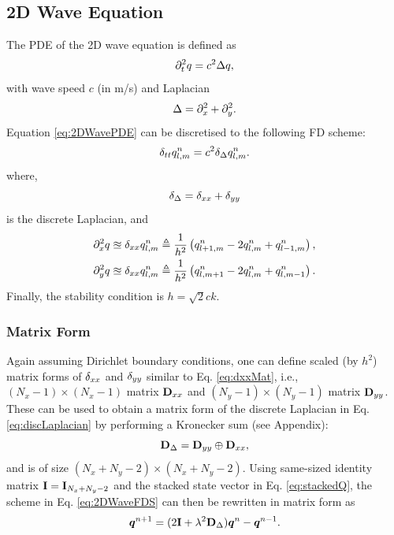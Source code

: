 \documentclass[fleqn]{jaes}
\begin{document}
\subsection{2D Wave Equation}
The PDE of the 2D wave equation is defined as
\begin{equation}\label{eq:2DWavePDE}
    \ptt q = c^2 \Delta q,
\end{equation}
with wave speed $c$ (in m/s) and Laplacian
\begin{equation}
    \Delta = \partial_x^2 + \partial_y^2.
\end{equation}
Equation \eqref{eq:2DWavePDE} can be discretised to the following FD scheme:
\begin{equation}\label{eq:2DWaveFDS}
    \dtt \qlmn = c^2 \dDelta \qlmn.
\end{equation}
where,
\begin{equation}\label{eq:discLaplacian}
    \dDelta = \dxx + \dyy
\end{equation}
is the discrete Laplacian, and 
\begin{subequations}
\begin{align}
    \partial_x^2 q &\approxeq \delta_{xx} q_{l,m}^n \triangleq \frac{1}{h^2}\left(q_{l+1,m}^n - 2 q_{l,m}^n + q_{l-1,m}^n\right),\\
    \partial_y^2 q &\approxeq \delta_{xx} q_{l,m}^n \triangleq \frac{1}{h^2}\left(q_{l,m+1}^n - 2 q_{l,m}^n + q_{l,m-1}^n\right).
\end{align}
\end{subequations}
Finally, the stability condition is $h = \sqrt{2}c k$.

\subsubsection{Matrix Form}
Again assuming Dirichlet boundary conditions, one can define scaled (by $h^2$) matrix forms of $\delta_{xx}$ and $\delta_{yy}$ similar to Eq. \eqref{eq:dxxMat}, i.e., $(N_x-1)\times(N_x-1)$ matrix $\mathbf{D}_{xx}$ and $(N_y-1)\times(N_y-1)$ matrix $\mathbf{D}_{yy}$. These can be used to obtain a matrix form of the discrete Laplacian in Eq. \eqref{eq:discLaplacian} by performing a Kronecker sum \cite{Horn1991} (see Appendix):
\begin{equation}\label{eq:kroneckerSum}
    \DDeltamat = \Dyy \oplus \Dxx,
\end{equation}
and is of size $(N_x+N_y-2)\times (N_x+N_y-2)$.
%
Using same-sized identity matrix $\mathbf{I} = \mathbf{I}_{N_x+N_y-2}$ and the stacked state vector in Eq. \eqref{eq:stackedQ}, the scheme in Eq. \eqref{eq:2DWaveFDS} can then be rewritten in matrix form as
\begin{equation}
    \boldsymbol{q}^{n+1} = (2\mathbf{I} + \lambda^2\mathbf{D}_\Delta)\boldsymbol{q}^n - \boldsymbol{q}^{n-1}.
\end{equation}
\end{document}
